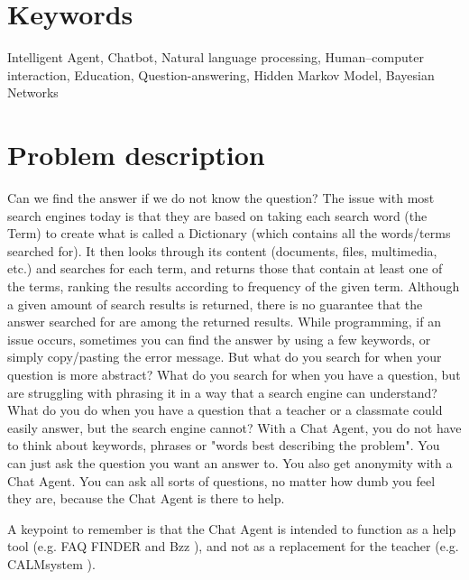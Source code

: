 \section{Keywords}
\label{chapter2:keywords}
Intelligent Agent, Chatbot, Natural language processing, Human–computer interaction, Education, Question-answering, Hidden Markov Model, Bayesian Networks

\section{Problem description}
\label{chapter2:problem_description}
Can we find the answer if we do not know the question? The issue with most search engines today is that they are based on taking each search word (the Term) to create what is called 
a Dictionary (which contains all the words/terms searched for). It then looks through its content (documents, files, multimedia, etc.) and searches for each term, and returns those 
that contain at least one of the terms, ranking the results according to frequency of the given term. Although a given amount of search results is returned, there is no guarantee that 
the answer searched for are among the returned results. While programming, if an issue occurs, sometimes you can find the answer by using a few keywords, or simply copy/pasting the 
error message. But what do you search for when your question is more abstract? What do you search for when you have a question, but are struggling with phrasing it in a way that a 
search engine can understand? What do you do when you have a question that a teacher or a classmate could easily answer, but the search engine cannot?
\vspace{0.5em}\newline
With a Chat Agent, you do not have to think about keywords, phrases or "words best describing the problem". You can just ask the question you want an answer to. You also get anonymity 
with a Chat Agent. You can ask all sorts of questions, no matter how dumb you feel they are, because the Chat Agent is there to help. 

A keypoint to remember is that the Chat Agent is intended to function as a help tool (e.g. FAQ FINDER \citet{Burke1997} and Bzz \citet{Crutzen2011}), and not as a replacement for the 
teacher (e.g. CALMsystem \citet{Kerly2008}).


